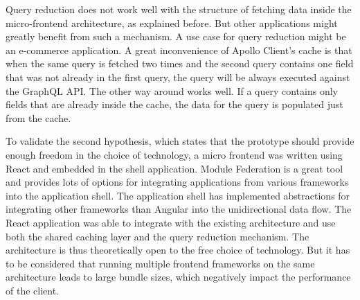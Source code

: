 \bigskip

\noindent Query reduction does not work well with the structure of fetching data inside the micro-frontend architecture, as explained before. But other applications might greatly benefit from such a mechanism. A use case for query reduction might be an e-commerce application. A great inconvenience of Apollo Client's cache is that when the same query is fetched two times and the second query contains one field that was not already in the first query, the query will be always executed against the GraphQL \ac{API}. The other way around works well. If a query contains only fields that are already inside the cache, the data for the query is populated just from the cache.

\bigskip

\noindent To validate the second hypothesis, which states that the prototype should provide enough freedom in the choice of technology, a micro frontend was written using React and embedded in the shell application. Module Federation is a great tool and provides lots of options for integrating applications from various frameworks into the application shell. The application shell has implemented abstractions for integrating other frameworks than Angular into the unidirectional data flow. The React application was able to integrate with the existing architecture and use both the shared caching layer and the query reduction mechanism. The architecture is thus theoretically open to the free choice of technology. But it has to be considered that running multiple frontend frameworks on the same architecture leads to large bundle sizes, which negatively impact the performance of the client.
